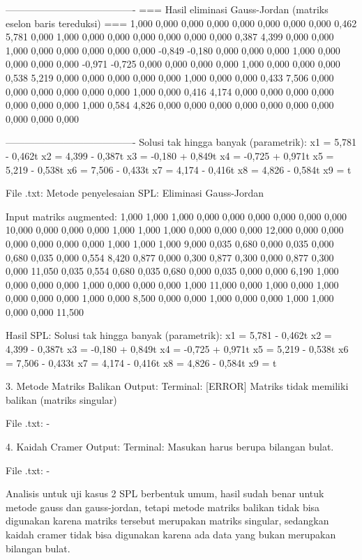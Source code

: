 \documentclass[12pt]{article}
\begin{document}
\begin{enumerate}
\begin{keluaran}
----------------------------------------
=== Hasil eliminasi Gauss-Jordan (matriks eselon baris tereduksi) ===
1,000   0,000   0,000   0,000   0,000   0,000   0,000   0,000   0,462   5,781
0,000   1,000   0,000   0,000   0,000   0,000   0,000   0,000   0,387   4,399
0,000   0,000   1,000   0,000   0,000   0,000   0,000   0,000   -0,849  -0,180
0,000   0,000   0,000   1,000   0,000   0,000   0,000   0,000   -0,971  -0,725
0,000   0,000   0,000   0,000   1,000   0,000   0,000   0,000   0,538   5,219
0,000   0,000   0,000   0,000   0,000   1,000   0,000   0,000   0,433   7,506
0,000   0,000   0,000   0,000   0,000   0,000   1,000   0,000   0,416   4,174
0,000   0,000   0,000   0,000   0,000   0,000   0,000   1,000   0,584   4,826
0,000   0,000   0,000   0,000   0,000   0,000   0,000   0,000   0,000   0,000

----------------------------------------
Solusi tak hingga banyak (parametrik):
x1 = 5,781 - 0,462t
x2 = 4,399 - 0,387t
x3 = -0,180 + 0,849t
x4 = -0,725 + 0,971t
x5 = 5,219 - 0,538t
x6 = 7,506 - 0,433t
x7 = 4,174 - 0,416t
x8 = 4,826 - 0,584t
x9 = t

File .txt:
Metode penyelesaian SPL: Eliminasi Gauss-Jordan

Input matriks augmented:
1,000	1,000	1,000	0,000	0,000	0,000	0,000	0,000	0,000	10,000
0,000	0,000	0,000	1,000	1,000	1,000	0,000	0,000	0,000	12,000
0,000	0,000	0,000	0,000	0,000	0,000	1,000	1,000	1,000	9,000
0,035	0,680	0,000	0,035	0,000	0,680	0,035	0,000	0,554	8,420
0,877	0,000	0,300	0,877	0,300	0,000	0,877	0,300	0,000	11,050
0,035	0,554	0,680	0,035	0,680	0,000	0,035	0,000	0,000	6,190
1,000	0,000	0,000	0,000	1,000	0,000	0,000	0,000	1,000	11,000
0,000	1,000	0,000	1,000	0,000	0,000	0,000	1,000	0,000	8,500
0,000	0,000	1,000	0,000	0,000	1,000	1,000	0,000	0,000	11,500

Hasil SPL:
Solusi tak hingga banyak (parametrik):
x1 = 5,781 - 0,462t
x2 = 4,399 - 0,387t
x3 = -0,180 + 0,849t
x4 = -0,725 + 0,971t
x5 = 5,219 - 0,538t
x6 = 7,506 - 0,433t
x7 = 4,174 - 0,416t
x8 = 4,826 - 0,584t
x9 = t

3. Metode Matriks Balikan
Output:
Terminal:
[ERROR] Matriks tidak memiliki balikan (matriks singular)

File .txt:
-

4. Kaidah Cramer
Output:
Terminal:
Masukan harus berupa bilangan bulat.

File .txt:
-
\end{keluaran}
Analisis untuk uji kasus 2 SPL berbentuk umum, hasil sudah benar untuk metode gauss dan gauss-jordan, tetapi metode matriks balikan tidak bisa digunakan karena matriks tersebut merupakan matriks singular, sedangkan kaidah cramer tidak bisa digunakan karena ada data yang bukan merupakan bilangan bulat.


\end{enumerate}
\end{document}
